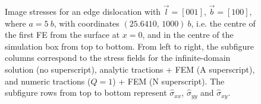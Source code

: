 \documentclass[11pt]{iopart}
\begin{document}
\begin{figure}
    \centering
    ~
    ~

    ~
    ~

    ~
    ~
    \caption{Image stresses for an edge dislocation with $\vec{l} = [0 0 1]$, $\vec{b} = [1 0 0]$, where $a = 5~b$, with coordinates $(25.6410,\, 1000)~b$, i.e. the centre of the first FE from the surface at $x=0$, and in the centre of the simulation box from top to bottom. From left to right, the subfigure columns correspond to the stress fields for the infinite-domain solution (no superscript), analytic tractions + FEM (A superscript), and numeric tractions ($Q = 1$) + FEM (N superscript). The subfigure rows from top to bottom represent $\hat{\sigma}_{xx}$, $\hat{\sigma}_{yy}$ and $\hat{\sigma}_{xy}$.}
    \label{f:head_vs_ana_vs_num_eperp}
\end{figure}
\end{document}
